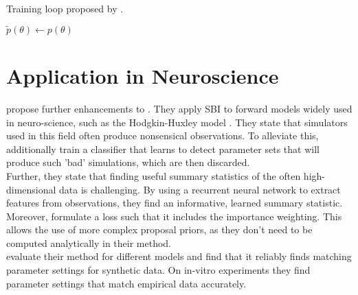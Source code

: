 \documentclass[12pt]{article}
\begin{document}
\begin{algorithm}[H]
	\caption{Training loop proposed by \citet{papamakarios2016fast}.}
	$\tilde{p}(\theta) \leftarrow p(\theta)$\\
	\label{alg:prior}
\end{algorithm}




\section*{Application in Neuroscience}
\citet{lueckmann2017flexible} propose further enhancements to \citet{papamakarios2016fast}. They apply SBI to forward models widely used in neuro-science, such as the Hodgkin-Huxley model \cite{hodgkin1952quantitative}. They state that simulators used in this field often produce nonsensical observations. To alleviate this, \citet{lueckmann2017flexible} additionally train a classifier that learns to detect parameter sets that will produce such 'bad' simulations, which are then discarded.\\
Further, they state that finding useful summary statistics of the often high-dimensional data is challenging. By using a  recurrent neural network to extract features from observations, they find an informative, learned summary statistic.\\
Moreover, \citet{lueckmann2017flexible} formulate a loss such that it includes the importance weighting. This allows the use of more complex proposal priors, as they don't need to be computed analytically in their method.\\
\citet{lueckmann2017flexible} evaluate their method for different models and find that it reliably finds matching parameter settings for synthetic data. On in-vitro experiments they find parameter settings that match empirical data accurately.
\end{document}

